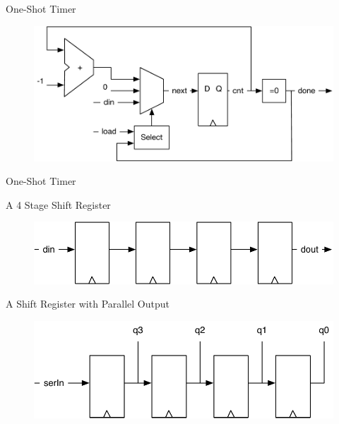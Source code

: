 \begin{frame}[fragile]{One-Shot Timer}
\begin{figure}
  \includegraphics[scale=\scale]{../figures/timer}
\end{figure}
\end{frame}

\begin{frame}[fragile]{One-Shot Timer}
\end{frame}

\begin{frame}[fragile]{A 4 Stage Shift Register}
\begin{figure}
  \includegraphics[scale=\scale]{../figures/shiftregister}
\end{figure}
\end{frame}


\begin{frame}[fragile]{A Shift Register with Parallel Output}
\begin{figure}
  \includegraphics[scale=\scale]{../figures/shiftreg-paraout}
\end{figure}
\end{frame}

